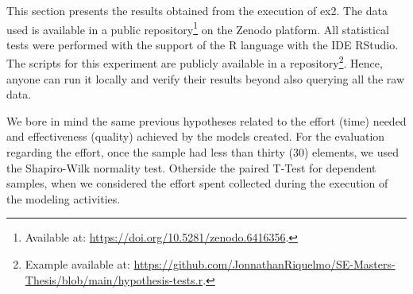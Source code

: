 This section presents the results obtained from the execution of \ac{ex2}.
The data used is available in a public repository\footnote{Available at: \url{https://doi.org/10.5281/zenodo.6416356}.} on the Zenodo platform.
All statistical tests were performed with the support of the R language with the IDE RStudio.
The scripts for this experiment are publicly available in a repository\footnote{Example available at: \url{https://github.com/JonnathanRiquelmo/SE-Masters-Thesis/blob/main/hypothesis-tests.r}.}. 
Hence, anyone can run it locally and verify their results beyond also querying all the raw data.

We bore in mind the same previous hypotheses related to the effort (time) needed and effectiveness (quality) achieved by the models created.
For the evaluation regarding the effort, once the sample had less than thirty (30) elements, we used the Shapiro-Wilk normality test.
Otherside the paired T-Test for dependent samples, when we considered the effort spent collected during the execution of the modeling activities.

